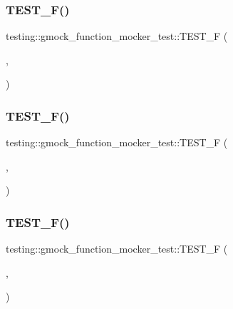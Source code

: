 \subsubsection{\texorpdfstring{TEST\_F()}{TEST\_F()}\hspace{0.1cm}{\footnotesize\ttfamily [11/13]}}
{\footnotesize\ttfamily testing\+::gmock\+\_\+function\+\_\+mocker\+\_\+test\+::\+T\+E\+S\+T\+\_\+F (\begin{DoxyParamCaption}\item[{\mbox{\hyperlink{classtesting_1_1gmock__function__mocker__test_1_1_mock_method_function_mocker_test}{Mock\+Method\+Function\+Mocker\+Test}}}]{,  }\item[{Mocks\+Functions\+Overloaded\+On\+Constness\+Of\+This}]{ }\end{DoxyParamCaption})}

\mbox{\label{namespacetesting_1_1gmock__function__mocker__test_a7761cd0e2989b3f40b8e5cdf118a1570}} 
\subsubsection{\texorpdfstring{TEST\_F()}{TEST\_F()}\hspace{0.1cm}{\footnotesize\ttfamily [12/13]}}
{\footnotesize\ttfamily testing\+::gmock\+\_\+function\+\_\+mocker\+\_\+test\+::\+T\+E\+S\+T\+\_\+F (\begin{DoxyParamCaption}\item[{\mbox{\hyperlink{classtesting_1_1gmock__function__mocker__test_1_1_mock_method_function_mocker_test}{Mock\+Method\+Function\+Mocker\+Test}}}]{,  }\item[{Mocks\+Return\+Type\+With\+Comma}]{ }\end{DoxyParamCaption})}

\mbox{\label{namespacetesting_1_1gmock__function__mocker__test_a1cebea8200248ab7277dedb21f245a5a}} 
\subsubsection{\texorpdfstring{TEST\_F()}{TEST\_F()}\hspace{0.1cm}{\footnotesize\ttfamily [13/13]}}
{\footnotesize\ttfamily testing\+::gmock\+\_\+function\+\_\+mocker\+\_\+test\+::\+T\+E\+S\+T\+\_\+F (\begin{DoxyParamCaption}\item[{\mbox{\hyperlink{classtesting_1_1gmock__function__mocker__test_1_1_mock_method_function_mocker_test}{Mock\+Method\+Function\+Mocker\+Test}}}]{,  }\item[{Mocks\+Type\+With\+Templated\+Copy\+Ctor}]{ }\end{DoxyParamCaption})}

